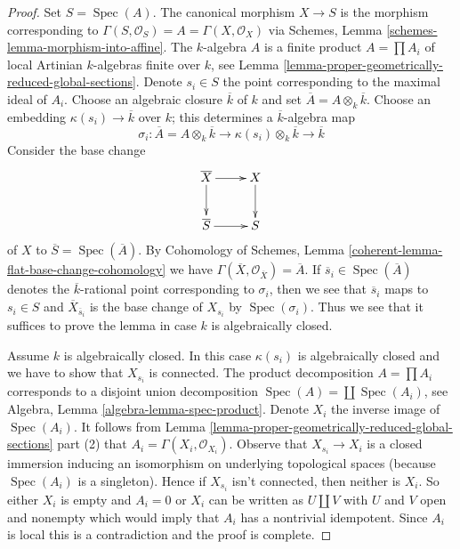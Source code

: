 \documentclass[10pt,a4paper]{amsart}
\theoremstyle{plain}
\theoremstyle{definition}
\theoremstyle{remark}
\numberwithin{equation}{subsection}
\def\Spec{\mathop{\mathrm{Spec}}}
\begin{document}
\begin{proof}
Set $S = \Spec(A)$. The canonical morphism $X \to S$
is the morphism corresponding to
$\Gamma(S, \mathcal{O}_S) = A = \Gamma(X, \mathcal{O}_X)$ via
Schemes, Lemma \ref{schemes-lemma-morphism-into-affine}.
The $k$-algebra $A$ is a finite product $A = \prod A_i$
of local Artinian $k$-algebras finite over $k$, see
Lemma \ref{lemma-proper-geometrically-reduced-global-sections}.
Denote $s_i \in S$ the point corresponding to the maximal
ideal of $A_i$. Choose an algebraic closure $\overline{k}$ of $k$ and
set $\overline{A} = A \otimes_k \overline{k}$.
Choose an embedding $\kappa(s_i) \to \overline{k}$ over $k$; this
determines a $\overline{k}$-algebra map
$$
\sigma_i : \overline{A} = A \otimes_k \overline{k} \to
\kappa(s_i) \otimes_k \overline{k} \to \overline{k}
$$
Consider the base change
$$
\xymatrix{
\overline{X} \ar[r] \ar[d] & X \ar[d] \\
\overline{S} \ar[r] & S
}
$$
of $X$ to $\overline{S} = \Spec(\overline{A})$. By
Cohomology of Schemes, Lemma
\ref{coherent-lemma-flat-base-change-cohomology} we have
$\Gamma(\overline{X}, \mathcal{O}_{\overline{X}}) = \overline{A}$.
If $\overline{s}_i \in \Spec(\overline{A})$ denotes the
$\overline{k}$-rational point corresponding to $\sigma_i$,
then we see that $\overline{s}_i$ maps to $s_i \in S$
and $\overline{X}_{\overline{s}_i}$ is the base change of
$X_{s_i}$ by $\Spec(\sigma_i)$. Thus we see that it suffices to prove
the lemma in case $k$ is algebraically closed.

\medskip\noindent
Assume $k$ is algebraically closed. In this case $\kappa(s_i)$
is algebraically closed and we have to show that $X_{s_i}$
is connected. The product decomposition
$A = \prod A_i$ corresponds to a disjoint union decomposition
$\Spec(A) = \coprod \Spec(A_i)$, see
Algebra, Lemma \ref{algebra-lemma-spec-product}.
Denote $X_i$ the inverse image of $\Spec(A_i)$.
It follows from
Lemma \ref{lemma-proper-geometrically-reduced-global-sections} part (2) that
$A_i = \Gamma(X_i, \mathcal{O}_{X_i})$.
Observe that $X_{s_i} \to X_i$ is a closed immersion inducing
an isomorphism on underlying topological spaces (because $\Spec(A_i)$
is a singleton). Hence if $X_{s_i}$ isn't connected, then neither is
$X_i$. So either $X_i$ is empty and $A_i = 0$ or $X_i$ can be written
as $U \amalg V$ with $U$ and $V$ open and nonempty which would
imply that $A_i$ has a nontrivial idempotent. Since $A_i$ is
local this is a contradiction and the proof is complete.
\end{proof}
\end{document}

